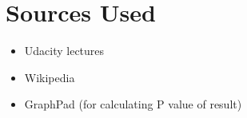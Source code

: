 \documentclass[a4paper,11pt]{report}
\begin{document}
\section{Sources Used}
  \begin{itemize}
    \item Udacity lectures
    \item Wikipedia
    \item GraphPad (for calculating P value of result)
  \end{itemize}
\end{document}
